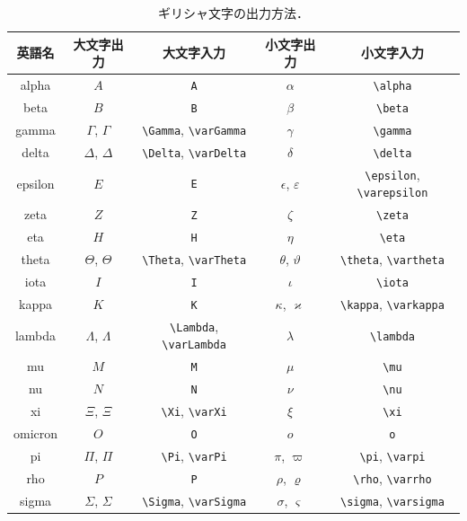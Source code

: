 \documentclass[
    paper=a4paper,      %
    article,            %
    fontsize=11pt,      %
    jafontsize=11pt,    %
    head_space=25mm,    %
    foot_space=25mm,    %
    gutter=20mm,        %
    fore-edge=20mm      %
    ]{jlreq}            %
\begin{document}
\begin{table}[t]
    \centering
    \caption{ギリシャ文字の出力方法．}
    \label{tb:greek}
    \begin{tabular}{c|c|c|c|c} \hline\hline
        英語名 & 大文字出力 & 大文字入力 & 小文字出力 & 小文字入力 \\ \hline
        alpha & $A$ & \verb|A| & $\alpha$ & \verb|\alpha| \\ \hline
        beta & $B$ & \verb|B| & $\beta$ & \verb|\beta| \\ \hline
        gamma & $\Gamma$, $\varGamma$ & \verb|\Gamma|, \verb|\varGamma| & $\gamma$ & \verb|\gamma| \\ \hline
        delta & $\Delta$, $\varDelta$ & \verb|\Delta|, \verb|\varDelta| & $\delta$ & \verb|\delta| \\ \hline
        epsilon & $E$ & \verb|E| & $\epsilon$, $\varepsilon$ & \verb|\epsilon|, \verb|\varepsilon| \\ \hline
        zeta & $Z$ & \verb|Z| & $\zeta$ & \verb|\zeta| \\ \hline
        eta & $H$ & \verb|H| & $\eta$ & \verb|\eta| \\ \hline
        theta & $\Theta$, $\varTheta$ & \verb|\Theta|, \verb|\varTheta| & $\theta$, $\vartheta$ & \verb|\theta|, \verb|\vartheta| \\ \hline
        iota & $I$ & \verb|I| & $\iota$ & \verb|\iota| \\ \hline
        kappa & $K$ & \verb|K| & $\kappa$, $\varkappa$ & \verb|\kappa|, \verb|\varkappa| \\ \hline
        lambda & $\Lambda$, $\varLambda$ & \verb|\Lambda|, \verb|\varLambda| & $\lambda$ & \verb|\lambda| \\ \hline
        mu & $M$ & \verb|M| & $\mu$ & \verb|\mu| \\ \hline
        nu & $N$ & \verb|N| & $\nu$ & \verb|\nu| \\ \hline
        xi & $\Xi$, $\varXi$ & \verb|\Xi|, \verb|\varXi| & $\xi$ & \verb|\xi| \\ \hline
        omicron & $O$ & \verb|O| & $o$ & \verb|o| \\ \hline
        pi & $\Pi$, $\varPi$ & \verb|\Pi|, \verb|\varPi| & $\pi$, $\varpi$ & \verb|\pi|, \verb|\varpi| \\ \hline
        rho & $P$ & \verb|P| & $\rho$, $\varrho$ & \verb|\rho|, \verb|\varrho| \\ \hline
        sigma & $\Sigma$, $\varSigma$ & \verb|\Sigma|, \verb|\varSigma| & $\sigma$, $\varsigma$ & \verb|\sigma|, \verb|\varsigma| \\ \hline

\end{tabular}
\end{table}
\end{document}
